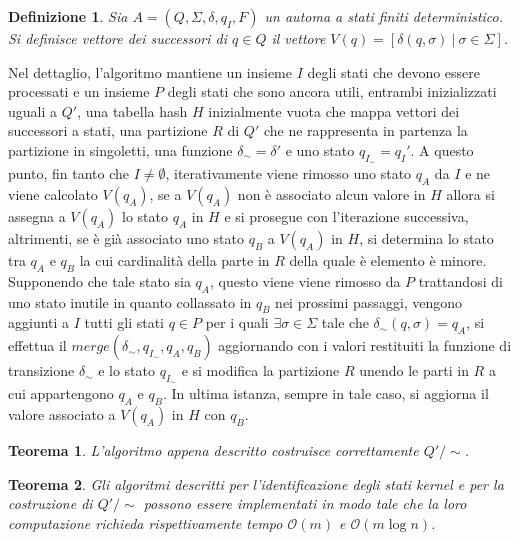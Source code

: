 \documentclass[a4paper,12pt]{report} %
\newcommand{\partitioned}[2]{#1\slash\!\!#2}  %
\newcommand{\bigo}[0]{\mathcal{O}}            %
\newtheorem{theorem}{Teorema}[chapter]        %
\newtheorem{definition}{Definizione}[chapter] %
\begin{document}
\begin{definition}
  Sia $A = (Q, \Sigma, \delta, q_I, F)$ un automa a stati finiti deterministico. Si definisce
  \emph{vettore dei successori} di $q \in Q$ il vettore $V(q) = [\delta(q, \sigma) \ | \ \sigma \in \Sigma]$.
\end{definition}

Nel dettaglio, l'algoritmo mantiene un insieme $I$ degli stati che devono essere processati e 
un insieme $P$ degli stati che sono ancora utili, entrambi inizializzati uguali a $Q'$,
una tabella hash $H$ inizialmente vuota che mappa vettori dei successori a stati,
una partizione $R$ di $Q'$ che ne rappresenta in partenza la partizione in singoletti, 
una funzione $\delta_\sim = \delta'$ e uno stato $q_{I_\sim} = q_I'$. 
A questo punto, fin tanto che $I \neq \emptyset$, iterativamente viene rimosso uno stato $q_A$ da $I$ e ne viene
calcolato $V(q_A)$, se a $V(q_A)$ non è associato alcun valore in $H$ allora si assegna a $V(q_A)$ lo stato $q_A$ in
$H$ e si prosegue con l'iterazione successiva, altrimenti, se è già associato uno stato $q_B$ a $V(q_A)$ in $H$, 
si determina lo stato tra $q_A$ e $q_B$ la cui cardinalità della parte in $R$ della quale è elemento è minore.
Supponendo che tale stato sia $q_A$, questo viene viene rimosso da $P$ trattandosi di uno stato inutile
in quanto collassato in $q_B$ nei prossimi passaggi, 
vengono aggiunti a $I$ tutti gli stati $q \in P$ per i quali $\exists \sigma \in \Sigma$ tale che
$\delta_\sim(q, \sigma) = q_A$, si effettua il $merge(\delta_\sim, q_{I_\sim}, q_A, q_B)$ aggiornando
con i valori restituiti la funzione di transizione $\delta_\sim$ e lo stato $q_{I_\sim}$ e 
si modifica la partizione $R$ unendo le parti in $R$ a cui appartengono $q_A$ e $q_B$. In ultima istanza, 
sempre in tale caso, si aggiorna il valore associato a $V(q_A)$ in $H$ con $q_B$.

\begin{theorem}\label{th:aeq-correctness}
  L'algoritmo appena descritto costruisce correttamente $\partitioned{Q'}{\sim}$.
\end{theorem}

\begin{theorem}
  \label{th:hm-complexity}
  Gli algoritmi descritti per l'identificazione degli stati kernel e per la costruzione di
  $\partitioned{Q'}{\sim}$ possono essere implementati in modo tale che la loro computazione richieda rispettivamente
  tempo $\bigo(m)$ e $\bigo(m \log n)$.
\end{theorem}
\end{document}

